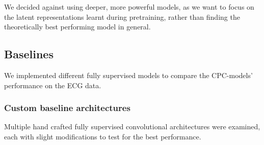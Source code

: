 We decided against using deeper, more powerful models, as we want to focus on the latent representations learnt during pretraining, rather than finding the theoretically best performing model in general.
\subsection{Baselines}
We implemented different fully supervised models to compare the CPC-models' performance on the ECG data.

\subsubsection{Custom baseline architectures}
Multiple hand crafted fully supervised convolutional architectures were examined, each with slight modifications to test for the best performance.  

